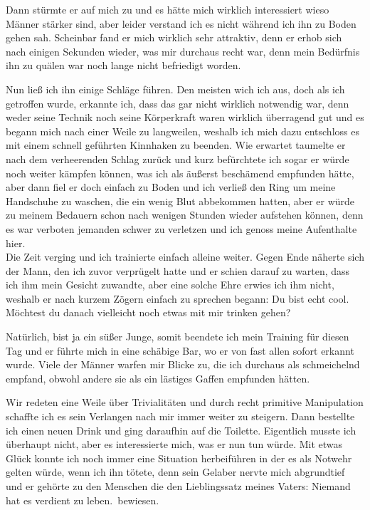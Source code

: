 \documentclass[11pt, a5paper]{article}
\newcommand{\nL}{Niemand hat es verdient zu leben.}
\begin{document}
\begin{spacing}{1.2}
		Dann stürmte er auf mich zu und es hätte mich wirklich interessiert wieso Männer stärker sind, aber leider verstand ich es nicht während ich ihn zu Boden gehen sah. Scheinbar fand er mich wirklich sehr attraktiv, denn er erhob sich nach einigen Sekunden wieder, was mir durchaus recht war, denn mein Bedürfnis ihn zu quälen war noch lange nicht befriedigt worden.
		
		Nun ließ ich ihn einige Schläge führen. Den meisten wich ich aus, doch als ich getroffen wurde, erkannte ich, dass das gar nicht wirklich notwendig war, denn weder seine Technik noch seine Körperkraft waren wirklich überragend gut und es begann mich nach einer Weile zu langweilen, weshalb ich mich dazu entschloss es mit einem schnell geführten Kinnhaken zu beenden. Wie erwartet taumelte er nach dem verheerenden Schlag zurück und kurz befürchtete ich sogar er würde noch weiter kämpfen können, was ich als äußerst beschämend empfunden hätte, aber dann fiel er doch einfach zu Boden und ich verließ den Ring um meine Handschuhe zu waschen, die ein wenig Blut abbekommen hatten, aber er würde zu meinem Bedauern schon nach wenigen Stunden wieder aufstehen können, denn es war verboten jemanden schwer zu verletzen und ich genoss meine Aufenthalte hier.\\
		
		Die Zeit verging und ich trainierte einfach alleine weiter. Gegen Ende näherte sich der Mann, den ich zuvor verprügelt hatte und er schien darauf zu warten, dass ich ihm mein Gesicht zuwandte, aber eine solche Ehre erwies ich ihm nicht, weshalb er nach kurzem Zögern einfach zu sprechen begann: \frqq Du bist echt cool. Möchtest du danach vielleicht noch etwas mit mir trinken gehen?\flqq
		
		\frqq Natürlich, bist ja ein süßer Junge\flqq, somit beendete ich mein Training für diesen Tag und er führte mich in eine schäbige Bar, wo er von fast allen sofort erkannt wurde. Viele der Männer warfen mir Blicke zu, die ich durchaus als schmeichelnd empfand, obwohl andere sie als ein lästiges Gaffen empfunden hätten.
		
		Wir redeten eine Weile über Trivialitäten und durch recht primitive Manipulation schaffte ich es sein Verlangen nach mir immer weiter zu steigern. Dann bestellte ich einen neuen Drink und ging daraufhin auf die Toilette. Eigentlich musste ich überhaupt nicht, aber es interessierte mich, was er nun tun würde. Mit etwas Glück konnte ich noch immer eine Situation herbeiführen in der es als Notwehr gelten würde, wenn ich ihn tötete, denn sein Gelaber nervte mich abgrundtief und er gehörte zu den Menschen die den Lieblingssatz meines Vaters: \frqq \nL\flqq\ bewiesen.
		

\end{spacing}
\end{document}
